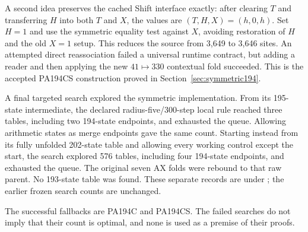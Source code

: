 A second idea preserves the cached Shift interface exactly: after
clearing $T$ and transferring $H$ into both $T$ and $X$, the values are
$(T,H,X)=(h,0,h)$. Set $H=1$ and use the symmetric equality test against
$X$, avoiding restoration of $H$ and the old $X=1$ setup. This reduces
the source from 3,649 to 3,646 sites. An attempted direct reassociation
failed a universal runtime contract, but adding a reader and then applying
the new $41\mapsto330$ contextual fold succeeded. This is the accepted
PA194CS construction proved in Section~\ref{sec:symmetric194}.

A final targeted search explored the symmetric implementation. From its
195-state intermediate, the declared radius-five/300-step local rule
reached three tables, including two 194-state endpoints, and exhausted
the queue. Allowing arithmetic states as merge endpoints gave the same
count. Starting instead from its fully unfolded 202-state table and
allowing every working control except the start, the search explored
576 tables, including four 194-state endpoints, and exhausted the queue.
The original seven AX folds were rebound to that raw parent. No 193-state
table was found. These separate records are under
; the earlier frozen search counts are
unchanged.

The successful fallbacks are PA194C and PA194CS. The failed searches do
not imply that their count is optimal, and none is used as a premise of
their proofs.
